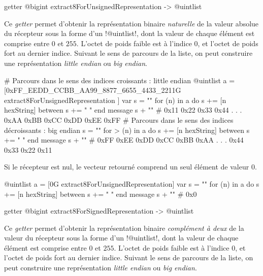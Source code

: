 
\begin{galgasbox}
getter @bigint extract8ForUnsignedRepresentation -> @uintlist
\end{galgasbox}

Ce \emph{getter} permet d'obtenir la représentation binaire \emph{naturelle} de la valeur absolue du récepteur sous la forme d'un \ggs!@uintlist!, dont la valeur de chaque élément est comprise entre $0$ et $255$. L'octet de poids faible est à l'indice $0$, et l'octet de poids fort au dernier indice. Suivant le sens de parcours de la liste, on peut construire une représentation \emph{little endian} ou \emph{big endian}.

\begin{galgas}
# Parcours dans le sens des indices croissants : little endian
@uintlist a = [0xFF_EEDD_CCBB_AA99_8877_6655_4433_2211G
  extract8ForUnsignedRepresentation
]
var s = ""
for (n) in a
  do s += [n hexString]
  between s += " "
end
message s + "\n" # 0x11 0x22 0x33 0x44 . . . 0xAA 0xBB 0xCC 0xDD 0xEE 0xFF 
# Parcours dans le sens des indices décroissants : big endian
s = ""
for > (n) in a
  do s += [n hexString]
  between s += " "
end
message s + "\n" # 0xFF 0xEE 0xDD 0xCC 0xBB 0xAA . . . 0x44 0x33 0x22 0x11
\end{galgas}

Si le récepteur est nul, le vecteur retourné comprend un seul élément de valeur $0$.

\begin{galgas}
@uintlist a = [0G extract8ForUnsignedRepresentation]
var s = ""
for (n) in a
  do s += [n hexString]
  between s += " "
end
message s + "\n" # 0x0
\end{galgas}


\begin{galgasbox}
getter @bigint extract8ForSignedRepresentation -> @uintlist
\end{galgasbox}

Ce \emph{getter} permet d'obtenir la représentation binaire \emph{complément à deux} de la valeur du récepteur sous la forme d'un \ggs!@uintlist!, dont la valeur de chaque élément est comprise entre $0$ et $255$. L'octet de poids faible est à l'indice $0$, et l'octet de poids fort au dernier indice. Suivant le sens de parcours de la liste, on peut construire une représentation \emph{little endian} ou \emph{big endian}.

